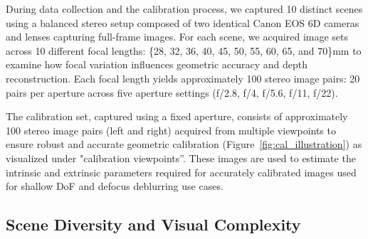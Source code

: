 
During data collection and the calibration process, we captured 10 distinct scenes using a balanced stereo setup composed of two identical Canon EOS 6D cameras and lenses capturing full-frame images. For each scene, we acquired image sets across 10 different focal lengths: \{28, 32, 36, 40, 45, 50, 55, 60, 65, and 70\}mm to examine how focal variation influences geometric accuracy and depth reconstruction. Each focal length yields approximately 100 stereo image pairs: 20 pairs per aperture across five aperture settings (f/2.8, f/4, f/5.6, f/11, f/22).

The calibration set, captured using a fixed aperture, consists of approximately 100 stereo image pairs (left and right) acquired from multiple viewpoints to ensure robust and accurate geometric calibration (Figure~\ref{fig:cal_illustration}) as visualized under "calibration viewpoints”. These images are used to estimate the intrinsic and extrinsic parameters required for accurately calibrated images used for shallow DoF and defocus deblurring use cases.



\subsection{Scene Diversity and Visual Complexity}\label{subsec:data_illu}

